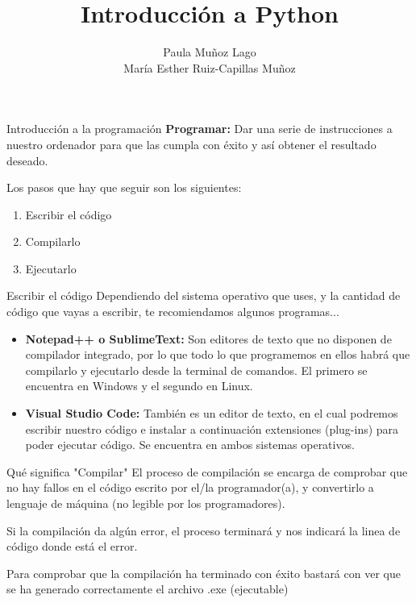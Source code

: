\documentclass{beamer}
\title{Introducción a Python}
\author{Paula Muñoz Lago \\ María Esther Ruiz-Capillas Muñoz}
\institute{Facultad de Informática, UCM}
\begin{document}
	\begin{frame}
	\maketitle
\end{frame}

\begin{frame} {Introducción a la programación}
\textbf{Programar:} Dar una serie de instrucciones a nuestro ordenador para que las cumpla con éxito y así obtener el resultado deseado.

Los pasos que hay que seguir son los siguientes: 
\begin{enumerate}
	\item Escribir el código
	\item Compilarlo
	\item Ejecutarlo
\end{enumerate}
\end{frame}

\begin{frame} {Escribir el código}
Dependiendo del sistema operativo que uses, y la cantidad de código que vayas a escribir, te recomiendamos algunos programas...

\begin{itemize}
\item \textbf{Notepad++ o SublimeText:} Son editores de texto que no disponen de compilador integrado, por lo que todo lo que programemos en ellos habrá que compilarlo y ejecutarlo desde la terminal de comandos. El primero se encuentra en Windows y el segundo en Linux.
\item \textbf{Visual Studio Code:} También es un editor de texto, en el cual podremos escribir nuestro código e instalar a continuación extensiones (plug-ins) para poder ejecutar código. Se encuentra en ambos sistemas operativos.
\end{itemize}
\end{frame}

\begin{frame}{Qué significa "Compilar"}
\setlength{\parskip}{8mm}
El proceso de compilación se encarga de comprobar que no hay fallos en el código escrito por el/la programador(a), y convertirlo a lenguaje de máquina (no legible por los programadores).

Si la compilación da algún error, el proceso terminará y nos indicará la linea de código donde está el error.

Para comprobar que la compilación ha terminado con éxito bastará con ver que se ha generado correctamente el archivo .exe (ejecutable)
\end{frame}
\end{document}
